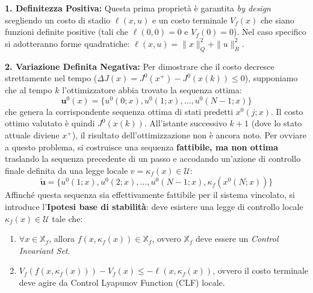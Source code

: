 \textbf{1. Definitezza Positiva:}
Questa prima proprietà è garantita \textit{by design} scegliendo un costo di stadio $\ell(x,u)$ e un costo terminale $V_f(x)$ che siano funzioni definite positive (tali che $\ell(0,0) = 0$ e $V_f(0) = 0$). Nel caso specifico si adotteranno forme quadratiche: $\ell(x,u) = \|x\|_Q^2 + \|u\|_R^2$.

\textbf{2. Variazione Definita Negativa:}
Per dimostrare che il costo decresce strettamente nel tempo ($\Delta J(x) = J^0(x^+) - J^0(x(k)) \le 0$), supponiamo che al tempo $k$ l'ottimizzatore abbia trovato la sequenza ottima:
\begin{equation}
	\mathbf{u}^0(x) = \{u^0(0;x), u^0(1;x), \dots, u^0(N-1;x)\}
\end{equation}
che genera la corrispondente sequenza ottima di stati predetti $x^0(j;x)$. Il costo ottimo valutato è quindi $J^0(x(k))$. 
All'istante successivo $k+1$ (dove lo stato attuale diviene $x^+$), il risultato dell'ottimizzazione non è ancora noto. Per ovviare a questo problema, si costruisce una sequenza \textbf{fattibile, ma non ottima} traslando la sequenza precedente di un passo e accodando un'azione di controllo finale definita da una legge locale $v = \kappa_f(x) \in \mathcal{U}$:
\begin{equation}
	\tilde{\mathbf{u}} = \{u^0(1;x), u^0(2;x), \dots, u^0(N-1;x), \kappa_f(x^0(N;x))\}
\end{equation}
Affinché questa sequenza sia effettivamente fattibile per il sistema vincolato, si introduce l'\textbf{Ipotesi base di stabilità}: deve esistere una legge di controllo locale $\kappa_f(x) \in \mathcal{U}$ tale che:
\begin{enumerate}
	\item $\forall x \in \mathbb{X}_f$, allora $f(x, \kappa_f(x)) \in \mathbb{X}_f$, ovvero $\mathbb{X}_f$ deve essere un \textit{Control Invariant Set}.
	\item $V_f(f(x, \kappa_f(x))) - V_f(x) \le -\ell(x, \kappa_f(x))$, ovvero il costo terminale deve agire da Control Lyapunov Function (CLF) locale.
\end{enumerate}


